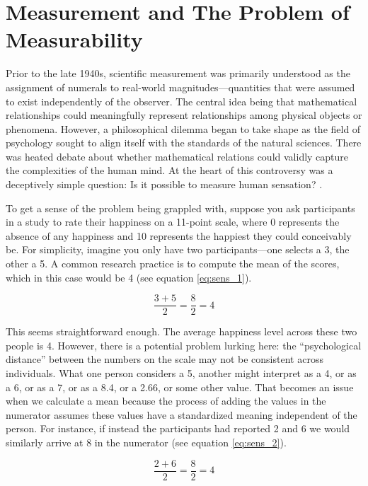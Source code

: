 \section{Measurement and The Problem of Measurability}

Prior to the late 1940s, scientific measurement was primarily understood as the assignment of numerals to real-world magnitudes—quantities that were assumed to exist independently of the observer. The central idea being that mathematical relationships could meaningfully represent relationships among physical objects or phenomena. However, a philosophical dilemma began to take shape as the field of psychology sought to align itself with the standards of the natural sciences. There was heated debate about whether mathematical relations could validly capture the complexities of the human mind. At the heart of this controversy was a deceptively simple question: Is it possible to measure human sensation? \parencite[p. 677]{Stevens1946}.

To get a sense of the problem being grappled with, suppose you ask participants in a study to rate their happiness on a 11-point scale, where 0 represents the absence of any happiness and 10 represents the happiest they could conceivably be. For simplicity, imagine you only have two participants—one selects a 3, the other a 5. A common research practice is to compute the mean of the scores, which in this case would be 4 (see equation \ref{eq:sens_1}). 

\begin{equation}
\frac{3 + 5}{2} = \frac{8}{2} = 4
\label{eq:sens_1}
\end{equation}

\noindent
This seems straightforward enough. The average happiness level across these two people is 4. However, there is a potential problem lurking here: the ``psychological distance'' between the numbers on the scale may not be consistent across individuals. What one person considers a 5, another might interpret as a 4, or as a 6, or as a 7, or as a 8.4, or a 2.66, or some other value. That becomes an issue when we calculate a mean because the process of adding the values in the numerator assumes these values have a standardized meaning independent of the person. For instance, if instead the participants had reported 2 and 6 we would similarly arrive at 8 in the numerator (see equation \ref{eq:sens_2}).

\begin{equation}
\frac{2 + 6}{2} = \frac{8}{2} = 4
\label{eq:sens_2}
\end{equation}

